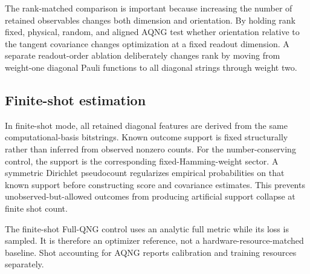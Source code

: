 The rank-matched comparison is important because increasing the number of retained observables changes both dimension and orientation. By holding rank fixed, physical, random, and aligned AQNG test whether orientation relative to the tangent covariance changes optimization at a fixed readout dimension. A separate readout-order ablation deliberately changes rank by moving from weight-one diagonal Pauli functions to all diagonal strings through weight two.

\subsection{Finite-shot estimation}
In finite-shot mode, all retained diagonal features are derived from the same computational-basis bitstrings. Known outcome support is fixed structurally rather than inferred from observed nonzero counts. For the number-conserving control, the support is the corresponding fixed-Hamming-weight sector. A symmetric Dirichlet pseudocount regularizes empirical probabilities on that known support before constructing score and covariance estimates. This prevents unobserved-but-allowed outcomes from producing artificial support collapse at finite shot count.

The finite-shot Full-QNG control uses an analytic full metric while its loss is sampled. It is therefore an optimizer reference, not a hardware-resource-matched baseline. Shot accounting for AQNG reports calibration and training resources separately.

